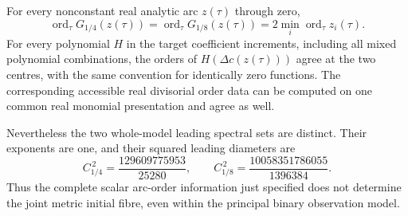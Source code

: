 \begin{theorem}\label{thm:binary-separation}
For every nonconstant real analytic arc $z(\tau)$ through zero,
\begin{equation}\label{eq:all-arc-orders}
 \operatorname{ord}_\tau G_{1/4}(z(\tau))
 =\operatorname{ord}_\tau G_{1/8}(z(\tau))
 =2\min_i\operatorname{ord}_\tau z_i(\tau).
\end{equation}
For every polynomial $H$ in the target coefficient increments, including
all mixed polynomial combinations, the orders of
$H(\Delta c(z(\tau)))$ agree at the two centres, with the same convention
for identically zero functions. The corresponding accessible real
divisorial order data can be computed on one common real monomial
presentation and agree as well.

Nevertheless the two whole-model leading spectral sets are distinct.
Their exponents are one, and their squared leading diameters are
\begin{equation}\label{eq:binary-diameters}
 C_{1/4}^{\,2}=\frac{129609775953}{25280},\qquad
 C_{1/8}^{\,2}=\frac{10058351786055}{1396384}.
\end{equation}
Thus the complete scalar arc-order information just specified does not
determine the joint metric initial fibre, even within the principal
binary observation model.
\end{theorem}

